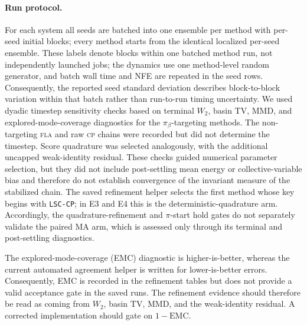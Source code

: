 \documentclass[11pt]{article}
\newcommand{\piB}{\pi_\beta}
\begin{document}
\paragraph{Run protocol.}
For each system all seeds are batched into one ensemble per method with
per-seed initial blocks; every method starts from the identical localized
per-seed ensemble.  These labels denote blocks within one batched method run,
not independently launched jobs; the dynamics use one method-level random
generator, and batch wall time and NFE are repeated in the seed rows.
Consequently, the reported seed standard deviation describes block-to-block
variation within that batch rather than run-to-run timing uncertainty.  We
used dyadic timestep sensitivity checks based on
terminal $W_2$, basin TV, MMD, and explored-mode-coverage diagnostics for
the $\piB$-targeting methods.  The non-targeting \textsc{fla} and raw
\textsc{cp} chains were recorded but did not determine the timestep.  Score
quadrature was selected analogously, with the additional uncapped
weak-identity residual.  These checks guided numerical parameter selection,
but they did not include post-settling mean energy or collective-variable bias
and therefore do not establish convergence of the invariant measure of the
stabilized chain.
The saved refinement helper selects the first method whose key begins with
\texttt{LSC-CP}; in E3 and E4 this is the deterministic-quadrature arm.
Accordingly, the quadrature-refinement and $\pi$-start hold gates do not
separately validate the paired MA arm, which is assessed only through its
terminal and post-settling diagnostics.

The explored-mode-coverage (EMC) diagnostic is higher-is-better, whereas the
current automated agreement helper is written for lower-is-better errors.
Consequently, EMC is recorded in the refinement tables but does not provide a
valid acceptance gate in the saved runs.  The refinement evidence should
therefore be read as coming from $W_2$, basin TV, MMD, and the weak-identity
residual.  A corrected implementation should gate on $1-\mathrm{EMC}$.
\end{document}
